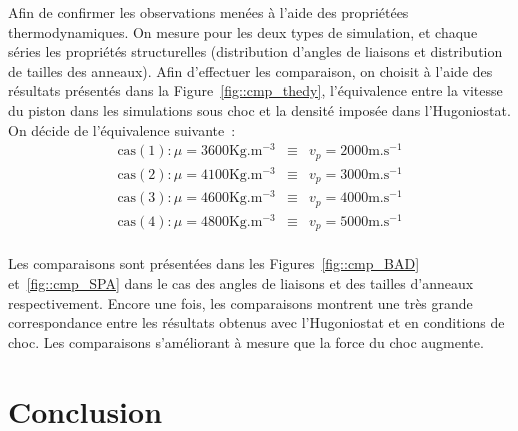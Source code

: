 \documentclass[aps,10pt,twocolumn]{revtex4}
\newcommand{\mrm}[1]{\ensuremath{\mathrm{#1}}\xspace}
\begin{document}
Afin de confirmer les observations men\'ees \`a l'aide des propri\'et\'ees thermodynamiques. On
mesure pour les deux types de simulation, et chaque s\'eries les propri\'et\'es structurelles
(distribution d'angles  de liaisons et distribution de tailles des anneaux). Afin d'effectuer
les comparaison, on choisit \`a l'aide des r\'esultats pr\'esent\'es dans la
Figure~\ref{fig::cmp_thedy}, l'\'equivalence entre la vitesse du piston dans les simulations sous
choc et la densit\'e impos\'ee dans l'Hugoniostat. On d\'ecide de l'\'equivalence suivante~:
\begin{eqnarray*} 
\mrm{cas (1) :}\mu=3600 \mrm{Kg.m^{-3}} &\equiv& v_p=2000 \mrm{m.s^{-1}}\\
\mrm{cas (2) :}\mu=4100 \mrm{Kg.m^{-3}} &\equiv& v_p=3000 \mrm{m.s^{-1}}\\
\mrm{cas (3) :}\mu=4600 \mrm{Kg.m^{-3}} &\equiv& v_p=4000 \mrm{m.s^{-1}}\\
\mrm{cas (4) :}\mu=4800 \mrm{Kg.m^{-3}} &\equiv& v_p=5000 \mrm{m.s^{-1}}\\
\end{eqnarray*}

Les comparaisons sont pr\'esent\'ees dans les Figures~\ref{fig::cmp_BAD} et~\ref{fig::cmp_SPA}
dans le cas des angles de liaisons et des tailles d'anneaux respectivement. Encore une fois, les
comparaisons montrent une tr\`es grande correspondance entre les r\'esultats obtenus avec
l'Hugoniostat et en conditions de choc. Les comparaisons s'am\'eliorant \`a mesure que 
la force du choc augmente.



\section*{Conclusion}
\end{document}
